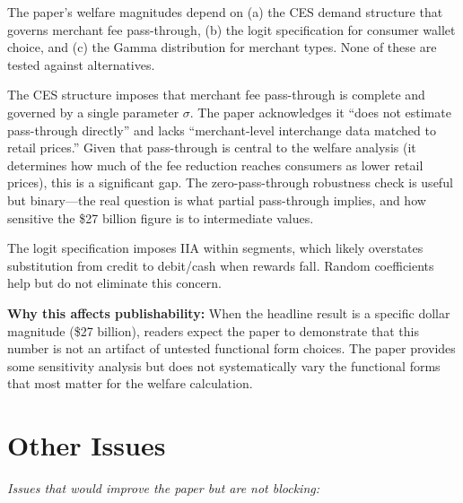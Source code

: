 \documentclass[11pt]{article}
\begin{document}
\begin{enumerate}[leftmargin=*]
    The paper's welfare magnitudes depend on (a) the CES demand structure that governs merchant fee pass-through, (b) the logit specification for consumer wallet choice, and (c) the Gamma distribution for merchant types. None of these are tested against alternatives.

    The CES structure imposes that merchant fee pass-through is complete and governed by a single parameter $\sigma$. The paper acknowledges it ``does not estimate pass-through directly'' and lacks ``merchant-level interchange data matched to retail prices.'' Given that pass-through is central to the welfare analysis (it determines how much of the fee reduction reaches consumers as lower retail prices), this is a significant gap. The zero-pass-through robustness check is useful but binary---the real question is what partial pass-through implies, and how sensitive the \$27 billion figure is to intermediate values.

    The logit specification imposes IIA within segments, which likely overstates substitution from credit to debit/cash when rewards fall. Random coefficients help but do not eliminate this concern.

    \textbf{Why this affects publishability:} When the headline result is a specific dollar magnitude (\$27 billion), readers expect the paper to demonstrate that this number is not an artifact of untested functional form choices. The paper provides some sensitivity analysis but does not systematically vary the functional forms that most matter for the welfare calculation.

\end{enumerate}

\section{Other Issues}

\textit{Issues that would improve the paper but are not blocking:}
\end{document}
